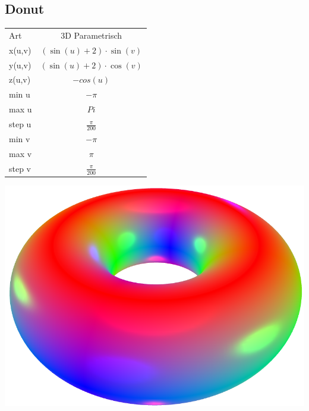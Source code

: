 \documentclass{scrartcl}
\begin{document}
\subsection{Donut}
\begin{tabular}[b]{|l|c|}
\hline
\rowcolor[gray]{0.5}
Art & 3D Parametrisch \\
\rowcolor[gray]{1}
x(u,v) & \((\sin(u)+2) \cdot \sin(v)\) \\
\rowcolor[gray]{0.5}
y(u,v) & \((\sin(u)+2) \cdot \cos(v)\) \\
\rowcolor[gray]{1}
z(u,v) & \(-cos(u)\) \\
\rowcolor[gray]{0.5}
min u & \(-\pi\) \\
\rowcolor[gray]{1}
max u & \(Pi\) \\
\rowcolor[gray]{0.5}
step u & \(\frac{\pi}{200}\) \\
\rowcolor[gray]{1}
min v & \(-\pi\) \\
\rowcolor[gray]{0.5}
max v & \(\pi\) \\
\rowcolor[gray]{1}
step v &\(\frac{\pi}{200}\) \\
\hline
\end{tabular}
\includegraphics[height=0.22\textheight]{images/graphs/donut.png}
\end{document}
